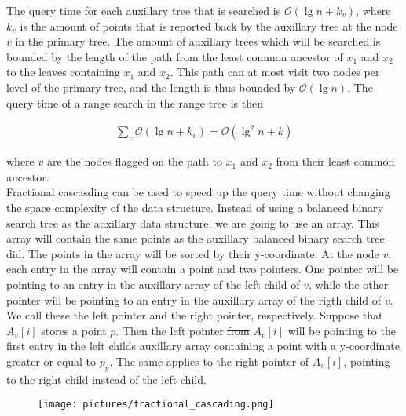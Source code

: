 \documentclass[twoside,11pt,openright]{report}
\providecommand{\DIFadd}[1]{{\protect\color{blue}\uwave{#1}}} %
\providecommand{\DIFdel}[1]{{\protect\color{red}\sout{#1}}}                      %
\providecommand{\DIFaddbegin}{} %
\providecommand{\DIFaddend}{} %
\providecommand{\DIFdelbegin}{} %
\providecommand{\DIFdelend}{} %
\providecommand{\DIFaddFL}[1]{\DIFadd{#1}} %
\begin{document}
The query time for each auxillary tree that is searched is $\mathcal{O}(\lg n + k_v)$, where $k_v$ is the amount of points that is reported back by the auxillary tree at the node $v$ in the primary tree. The amount of auxillary trees which will be searched is bounded by the length of the path from the least common ancestor of $x_1$ and $x_2$ to the leaves containing $x_1$ and $x_2$. This path can at most visit two nodes per level of the primary tree, and the length is thus bounded by $\mathcal{O}(\lg n)$. The query time of a range search in the range tree is then 

\begin{align*}
  \sum\limits_{v} \mathcal{O}(\lg n + k_v) = \mathcal{O}(\lg^2 n + k)
\end{align*}

\noindent where $v$ are the nodes flagged on the path to $x_1$ and $x_2$ from their least common ancestor. \\

Fractional cascasding can be used to speed up the query time without changing the space complexity of the data structure. Instead of using a balanced binary search tree as the auxillary data structure, we are going to use an array. This array will contain the same points as the auxillary balanced binary search tree did. The points in the array will be sorted by their y-coordinate. At the node $v$, each entry in the array \DIFaddbegin \DIFadd{$A_v$}\DIFaddend will contain a point and two pointers. One pointer will be pointing to an entry in the auxillary array of the left child of $v$, while the other pointer will be pointing to an entry in the auxillary array of the rigth child of $v$. We call these the left pointer and the right pointer, respectively. Suppose that $A_v[i]$ stores a point $p$. Then the left pointer \DIFdelbegin \DIFdel{from }\DIFdelend \DIFaddbegin \DIFadd{at }\DIFaddend $A_v[i]$ will be pointing to the first entry in the left childs auxillary array containing a point with a y-coordinate greater or equal to $p_y$. The same applies to the right pointer of $A_v[i]$, pointing to the right child instead of the left child. \\

\DIFaddbegin \begin{figure}[h]
    \centering
    \texttt{[image: pictures/fractional\_cascading.png]}
    \caption{\DIFaddFL{Example of an fractional cascading}}\label{fig:fractional}
\end{figure}
\end{document}
